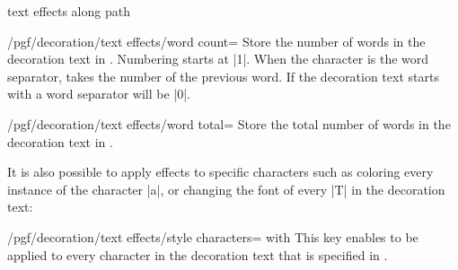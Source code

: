 \begin{decoration}{text effects along path}
    \begin{key}{/pgf/decoration/text effects/word count=}
        Store the number of words in the decoration text in .
        Numbering starts at |1|. When the character is the word separator,
         takes the number of the previous word. If the decoration
        text starts with a word separator  will be |0|.
\begin{codeexample}[preamble={\usetikzlibrary{decorations.text}}]
\end{codeexample}
    \end{key}

    \begin{key}{/pgf/decoration/text effects/word total=}
        Store the total number of words in the decoration text in .
    \end{key}

    It is also possible to apply effects to specific characters such as
    coloring every instance of the character |a|, or changing the font of every
    |T| in the decoration text:

    \begin{key}{/pgf/decoration/text effects/style characters= with }
        This key enables  to be applied to every character in the
        decoration text that is specified in .
\begin{codeexample}[preamble={\usetikzlibrary{decorations.text}}]
\end{codeexample}
    \end{key}


\end{decoration}
